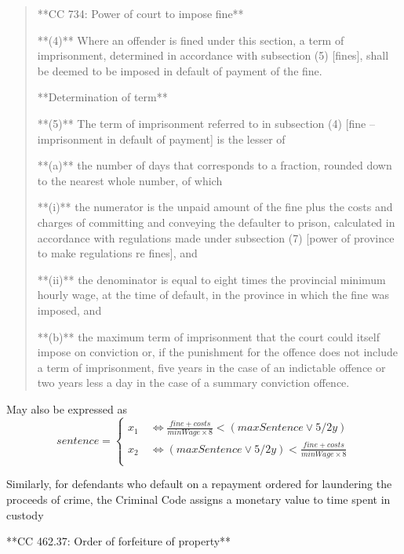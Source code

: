 \begin{quote}
    **CC 734: Power of court to impose fine**
    
    **(4)** Where an offender is fined under this section, a term of imprisonment, determined in accordance with subsection (5) [fines], shall be deemed to be imposed in default of payment of the fine.
    
    **Determination of term**
    
    **(5)** The term of imprisonment referred to in subsection (4) [fine – imprisonment in default of payment] is the lesser of
    
        **(a)** the number of days that corresponds to a fraction, rounded down to the nearest whole number, of which
        
            **(i)** the numerator is the unpaid amount of the fine plus the costs and charges of committing and conveying the defaulter to prison, calculated in accordance with regulations made under subsection (7) [power of province to make regulations re fines], and
            
            **(ii)** the denominator is equal to eight times the provincial minimum hourly wage, at the time of default, in the province in which the fine was imposed, and
        
        **(b)** the maximum term of imprisonment that the court could itself impose on conviction or, if the punishment for the offence does not include a term of imprisonment, five years in the case of an indictable offence or two years less a day in the case of a summary conviction offence.

\end{quote}

May also be expressed as
\begin{equation*}
sentence =\begin{cases}
x_1 \quad  \iff \frac{fine + costs}{minWage \times 8} < (maxSentence \lor 5/2y) \\
x_2 \quad \iff (maxSentence \lor 5/2y) < \frac{fine + costs}{minWage \times 8}  \\
\end{cases}
\end{equation*}

Similarly, for defendants who default on a repayment ordered for laundering the proceeds of crime, the Criminal Code assigns a monetary value to time spent in custody

**CC 462.37: Order of forfeiture of property**

